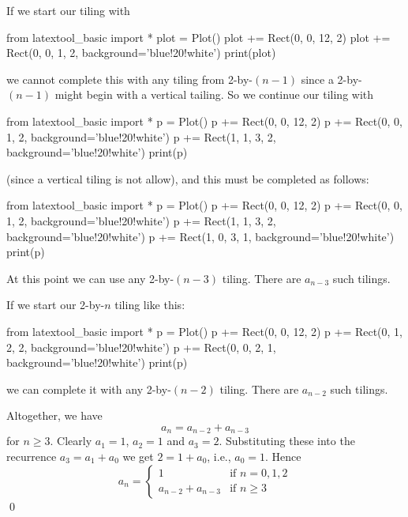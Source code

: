 If we start our tiling with
\begin{python}
from latextool_basic import *
plot = Plot()
plot += Rect(0, 0, 12, 2)
plot += Rect(0, 0, 1, 2, background='blue!20!white')
print(plot)
\end{python}
we cannot complete this with any tiling from 2-by-$(n-1)$ since
a 2-by-$(n-1)$ might begin with a vertical tailing.
So we continue our tiling with
\begin{python}
from latextool_basic import *
p = Plot()
p += Rect(0, 0, 12, 2)
p += Rect(0, 0, 1, 2, background='blue!20!white')
p += Rect(1, 1, 3, 2, background='blue!20!white')
print(p)
\end{python}
(since a vertical tiling is not allow), and this
must be completed as follows:
\begin{python}
from latextool_basic import *
p = Plot()
p += Rect(0, 0, 12, 2)
p += Rect(0, 0, 1, 2, background='blue!20!white')
p += Rect(1, 1, 3, 2, background='blue!20!white')
p += Rect(1, 0, 3, 1, background='blue!20!white')
print(p)
\end{python}
At this point we can use any 2-by-$(n-3)$ tiling.
There are $a_{n-3}$ such tilings.

If we start our 2-by-$n$ tiling like this:
\begin{python}
from latextool_basic import *
p = Plot()
p += Rect(0, 0, 12, 2)
p += Rect(0, 1, 2, 2, background='blue!20!white')
p += Rect(0, 0, 2, 1, background='blue!20!white')
print(p)
\end{python}
we can complete it with any 2-by-$(n-2)$ tiling.
There are $a_{n-2}$ such tilings.

Altogether, we have
\[
a_n = a_{n-2} + a_{n-3}
\]
for $n \geq 3$.
Clearly $a_1 = 1$, $a_2 = 1$ and $a_3 = 2$.
Substituting these into the recurrence
$a_{3} = a_{1} + a_{0}$
we get
$2 = 1 + a_0$, i.e., $a_0 = 1$.
Hence
\[
a_n =
\begin{cases}
  1               & \text{if } n = 0,1,2 \\
  a_{n-2} + a_{n-3} & \text{if } n \geq 3 
\end{cases}
\]
\qed
